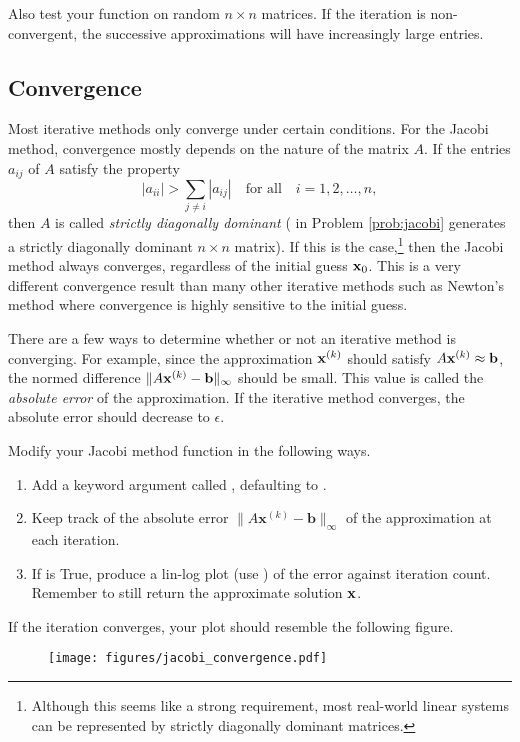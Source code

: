 \begin{problem}
Also test your function on random $n \times n$ matrices.
If the iteration is non-convergent, the successive approximations will have increasingly large entries.
\label{prob:jacobi}
\end{problem}

\subsection*{Convergence} %

Most iterative methods only converge under certain conditions.
For the Jacobi method, convergence mostly depends on the nature of the matrix $A$.
If the entries $a_{ij}$ of $A$ satisfy the property
\[
|a_{ii}| > \sum_{j \neq i} |a_{ij}|\quad \text{for all}\quad i = 1,2,\ldots,n,
\]
then $A$ is called \emph{strictly diagonally dominant} ( in Problem \ref{prob:jacobi} generates a strictly diagonally dominant $n\times n$ matrix).
If this is the case,\footnote{Although this seems like a strong requirement, most real-world linear systems can be represented by strictly diagonally dominant matrices.} then the Jacobi method always converges, regardless of the initial guess $\mathbf{x}_0$.
This is a very different convergence result than many other iterative methods such as Newton's method where convergence is highly sensitive to the initial guess.

There are a few ways to determine whether or not an iterative method is converging.
For example, since the approximation $\mathbf{x}^{(k)}$ should satisfy $A\mathbf{x}^{(k)} \approx \mathbf{b}$, the normed difference $\|A\mathbf{x}^{(k)} - \mathbf{b}\|_\infty$ should be small.
This value is called the \emph{absolute error} of the approximation.
If the iterative method converges, the absolute error should decrease to $\epsilon$.

\begin{problem}
Modify your Jacobi method function in the following ways.
\begin{enumerate}
    \item Add a keyword argument called , defaulting to .
    \item Keep track of the absolute error $\|A\mathbf{x}^{(k)} - \mathbf{b}\|_{\infty}$ of the approximation at each iteration.
    \item If  is {True}, produce a lin-log plot (use ) of the error against iteration count.
    Remember to still return the approximate solution $\mathbf{x}$.
\end{enumerate}
If the iteration converges, your plot should resemble the following figure.

\begin{figure}[H]
    \texttt{[image: figures/jacobi\_convergence.pdf]}
\end{figure}

\label{prob:plot-iterative-convergence}
\end{problem}

